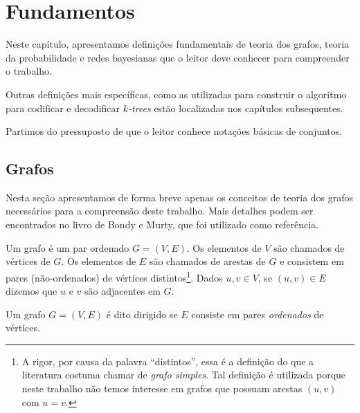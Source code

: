 \chapter{Fundamentos}
\label{cap:fundamentos}

Neste capítulo, apresentamos definições fundamentais de teoria dos grafos, teoria da probabilidade e redes bayesianas que o leitor deve conhecer para compreender o trabalho.

Outras definições mais específicas, como as utilizadas para construir o algoritmo para codificar e decodificar \emph{$k$-trees} estão localizadas nos capítulos subsequentes.

Partimos do pressuposto de que o leitor conhece notações básicas de conjuntos.

\section{Grafos}

Nesta seção apresentamos de forma breve apenas os conceitos de teoria dos grafos necessários para a compreensão deste trabalho. Mais detalhes podem ser encontrados no livro de Bondy e Murty\cite{bondy}, que foi utilizado como referência.

\begin{definition}[grafo]
  Um grafo é um par ordenado $G = (V, E)$. Os elementos de $V$ são chamados de vértices de $G$. Os elementos de $E$ são chamados de arestas de $G$ e consistem em pares (não-ordenados) de vértices distintos\footnote{A rigor, por causa da palavra ``distintos'', essa é a definição do que a literatura costuma chamar de \emph{grafo simples}. Tal definição é utilizada porque neste trabalho não temos interesse em grafos que possuam arestas $(u, v)$ com $u=v$.}. Dados $u, v \in V$, se $(u, v) \in E$ dizemos que $u$ e $v$ são adjacentes em $G$.
\end{definition}

\begin{definition}
  Um grafo $G = (V, E)$ é dito dirigido se $E$ consiste em pares \emph{ordenados} de vértices.
\end{definition}

